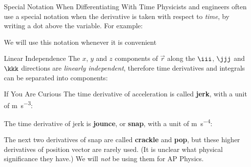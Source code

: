 \documentclass[12pt,compress,aspectratio=169,dvipsnames]{beamer}
\begin{document}
\begin{frame}{Special Notation When Differentiating With Time}
  Physicists and engineers often use a special notation when the derivative is
  taken with respect to \emph{time}, by writing a dot above the variable. For
  example:

  \vspace{-.3in}{\large
    \begin{align*}
      v &= \dot r \\
      a &= \dot v =\ddot r
    \end{align*}
  }

  We will use this notation whenever it is convenient
\end{frame}


\begin{frame}{Linear Independence}
  The $x$, $y$ and $z$ components of $\vec r$ along the $\iii$, $\jjj$ and
  $\kkk$ directions are \emph{linearly independent}, therefore time
  derivatives and integrals can be separated into components:

\end{frame}



\begin{frame}{If You Are Curious}
  The time derivative of acceleration is called \textbf{jerk}, with a unit
  of \si{\metre\per\second\cubed}:


  The time derivative of jerk is \textbf{jounce}, or \textbf{snap}, with a
  unit of \si{\metre\per\second^4}:
  
  
  The next two derivatives of snap are called \textbf{crackle} and
  \textbf{pop}, but these higher derivatives of position vector are rarely used.
  (It is unclear what physical significance they have.) We will \emph{not} be
  using them for AP Physics.
\end{frame}
\end{document}
